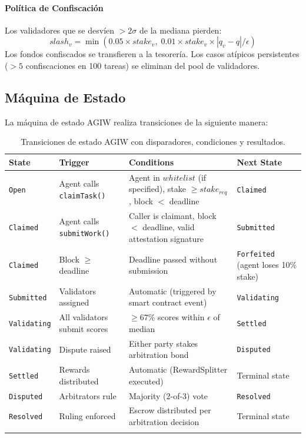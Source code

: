 \documentclass[11pt]{article}
\begin{document}
\paragraph{Política de Confiscación} Los validadores que se desvíen $>2\sigma$ de la mediana pierden:
\begin{equation}
slash_v = \min(0.05 \times stake_v, \; 0.01 \times stake_v \times |q_v - q| / \epsilon)
\end{equation}
Los fondos confiscados se transfieren a la tesorería. Los casos atípicos persistentes ($>5$ confiscaciones en 100 tareas) se eliminan del pool de validadores.

\subsection{Máquina de Estado}
\label{sec:agiw-state-machine}
La máquina de estado AGIW realiza transiciones de la siguiente manera:
\begin{longtable}{@{}p{}p{}p{}p{}@{}}
\toprule
\textbf{State} & \textbf{Trigger} & \textbf{Conditions} & \textbf{Next State} \\\midrule
\texttt{Open} & Agent calls \texttt{claimTask()} & Agent in $whitelist$ (if specified), stake $\geq stake_{req}$, block $<$ deadline & \texttt{Claimed} \\
\texttt{Claimed} & Agent calls \texttt{submitWork()} & Caller is claimant, block $<$ deadline, valid attestation signature & \texttt{Submitted} \\
\texttt{Claimed} & Block $\geq$ deadline & Deadline passed without submission & \texttt{Forfeited} (agent loses 10\% stake) \\
\texttt{Submitted} & Validators assigned & Automatic (triggered by smart contract event) & \texttt{Validating} \\
\texttt{Validating} & All validators submit scores & $\geq 67\%$ scores within $\epsilon$ of median & \texttt{Settled} \\
\texttt{Validating} & Dispute raised & Either party stakes arbitration bond & \texttt{Disputed} \\
\texttt{Settled} & Rewards distributed & Automatic (RewardSplitter executed) & Terminal state \\
\texttt{Disputed} & Arbitrators rule & Majority (2-of-3) vote & \texttt{Resolved} \\
\texttt{Resolved} & Ruling enforced & Escrow distributed per arbitration decision & Terminal state \\\bottomrule
\caption{Transiciones de estado AGIW con disparadores, condiciones y resultados.}
\label{tab:agiw-states}
\end{longtable}
\end{document}
